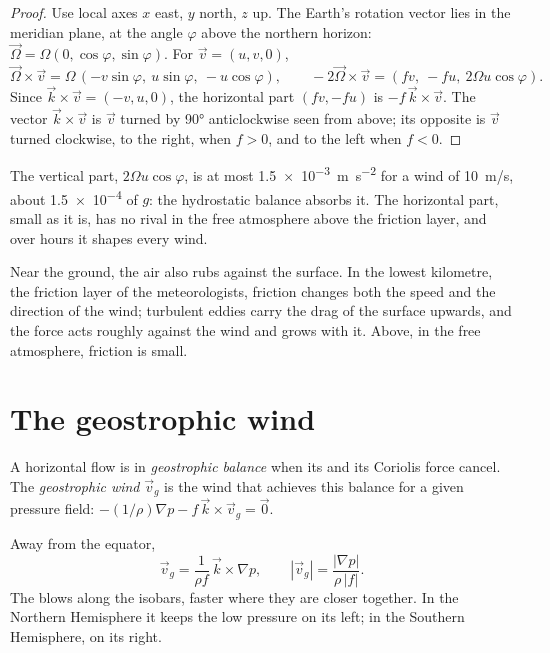 \begin{proof}
Use local axes $x$ east, $y$ north, $z$ up. The Earth's rotation vector lies in the
meridian plane, at the angle $\varphi$ above the northern horizon: $\vec\Omega =
\Omega(0, \cos\varphi, \sin\varphi)$. For $\vec v = (u, v, 0)$,
\[
  \vec\Omega\times\vec v = \Omega\,(-v\sin\varphi,\ u\sin\varphi,\ -u\cos\varphi),
  \qquad -2\vec\Omega\times\vec v = (f v,\ -f u,\ 2\Omega u\cos\varphi).
\]
Since $\vec k\times\vec v = (-v, u, 0)$, the horizontal part $(fv, -fu)$ is
$-f\,\vec k\times\vec v$. The vector $\vec k\times\vec v$ is $\vec v$ turned by
\ang{90} anticlockwise seen from above; its opposite is $\vec v$ turned clockwise,
to the right, when $f > 0$, and to the left when $f < 0$.
\end{proof}

The vertical part, $2\Omega u\cos\varphi$, is at most \qty{1.5e-3}{m.s^{-2}} for a
wind of \qty{10}{m/s}, about \num{1.5e-4} of $g$: the hydrostatic balance
absorbs it. The horizontal part, small as it is, has no rival in the free
atmosphere above the friction layer, and over hours it shapes every wind.

Near the ground, the air also rubs against the surface. In the lowest kilometre, the
friction layer of the meteorologists, friction changes both the speed and the
direction of the wind; turbulent eddies carry the drag of the surface upwards, and the
force acts roughly against the wind and grows with it. Above, in the free atmosphere,
friction is small.

\section{The geostrophic wind}\label{sec:b1:atmospheric-circulation:geostrophic}

\begin{definition}\label{def:b1:atmospheric-circulation:geostrophic}
A horizontal flow is in \emph{geostrophic balance} when
its  and its Coriolis force cancel. The \emph{geostrophic
wind} $\vec v_g$ is the wind that achieves this balance for a
given pressure field: $-(1/\rho)\nabla p - f\,\vec k\times\vec v_g = \vec 0$.
\end{definition}

\begin{theorem}\label{thm:b1:atmospheric-circulation:geostrophic}
Away from the equator,
\[
  \vec v_g = \frac{1}{\rho f}\,\vec k\times\nabla p, \qquad
  |\vec v_g| = \frac{|\nabla p|}{\rho\,|f|} .
\]
The  blows along the isobars, faster where they are closer together.
In the Northern Hemisphere it keeps the low pressure on its left; in the Southern
Hemisphere, on its right.
\end{theorem}

